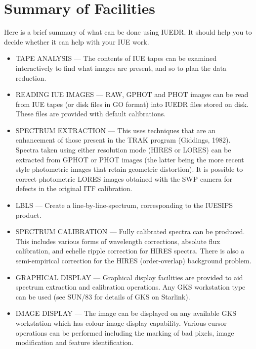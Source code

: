 \section {Summary of Facilities}

Here is a brief summary of what can be done using IUEDR. It should
help you to decide whether it can help with your IUE work.

\begin {itemize}

\item TAPE ANALYSIS --- The contents of IUE tapes can be examined
interactively to find what images are present, and so to plan the data
reduction.

\item READING IUE IMAGES --- RAW, GPHOT and PHOT images can be read
from IUE tapes (or disk files in  GO format) into IUEDR files stored
on disk. These files are provided with default calibrations.

\item SPECTRUM EXTRACTION --- This uses techniques that are an
enhancement of those present in the TRAK program (Giddings, 1982).
Spectra taken using either resolution mode (HIRES or LORES) can be
extracted from GPHOT or PHOT images (the latter being the more recent
style photometric images that retain geometric distortion). It is
possible to correct photometric LORES images obtained with the SWP
camera for defects in the original ITF calibration. 

\item LBLS --- Create a line-by-line-spectrum, corresponding to the
IUESIPS product.

\item SPECTRUM CALIBRATION --- Fully calibrated spectra can be
produced. This includes various forms of wavelength corrections,
absolute flux calibration, and echelle ripple correction for HIRES
spectra. There is also a semi-empirical correction for the HIRES
(order-overlap) background problem. 

\item GRAPHICAL DISPLAY --- Graphical display facilities are provided
to aid spectrum extraction and calibration operations. Any GKS
workstation type can be used (see SUN/83 for details of GKS on 
Starlink).

\item IMAGE DISPLAY --- The image can be displayed on any available
GKS workstation which has colour image display capability. Various
cursor operations can be performed including the marking of bad
pixels, image modification and feature identification.


\end{itemize}
